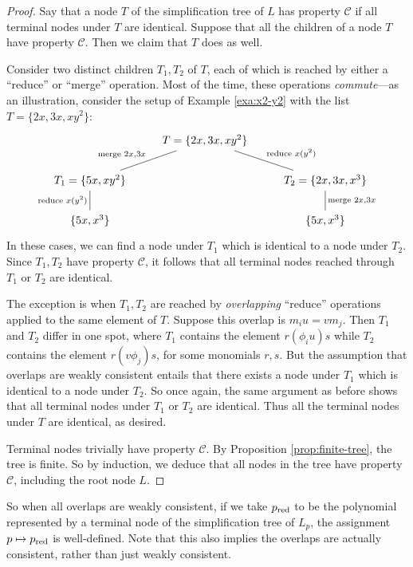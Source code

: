 \begin{proof}
	Say that a node $T$ of the simplification tree of $L$ has property $\mathcal{C}$ if all terminal nodes under $T$ are identical. Suppose that all the children of a node $T$ have property $\mathcal{C}$. Then we claim that $T$ does as well.
	
	Consider two distinct children $T_1, T_2$ of $T$, each of which is reached by either a ``reduce'' or ``merge'' operation. Most of the time, these operations \emph{commute}---as an illustration, consider the setup of Example \ref{exa:x2-y2} with the list $T = \{2x, 3x, xy^2\}$:
	\[\begin{tikzcd}
	& T = \{2x, 3x, xy^2\} \arrow[dash, dl, swap, "\text{merge }2x{,} 3x"] \arrow[dash, dr, "\text{reduce }x(y^2)"]\\
	T_1=\{5x, xy^2\}\arrow[dash,d,swap, "\text{reduce }x(y^2)"] && T_2=\{2x, 3x, x^3\} \arrow[dash,d,"\text{merge }2x{,} 3x"]\\
	\{5x, x^3\} && \{5x, x^3\}
	\end{tikzcd}\]
	In these cases, we can find a node under $T_1$ which is identical to a node under $T_2$. Since $T_1,T_2$ have property $\mathcal{C}$, it follows that all terminal nodes reached through $T_1$ or $T_2$ are identical.
	
	The exception is when $T_1,T_2$ are reached by \emph{overlapping} ``reduce'' operations applied to the same element of $T$. Suppose this overlap is $m_i u = vm_j$. Then $T_1$ and $T_2$ differ in one spot, where $T_1$ contains the element $r(\phi_i u)s$ while $T_2$ contains the element $r(v\phi_j)s$, for some monomials $r,s$. But the assumption that overlaps are weakly consistent entails that there exists a node under $T_1$ which is identical to a node under $T_2$. So once again, the same argument as before shows that all terminal nodes under $T_1$ or $T_2$ are identical. Thus all the terminal nodes under $T$ are identical, as desired.
	
	Terminal nodes trivially have property $\mathcal{C}$. By Proposition \ref{prop:finite-tree}, the tree is finite. So by induction, we deduce that all nodes in the tree have property $\mathcal{C}$, including the root node $L$.
\end{proof}
So when all overlaps are weakly consistent, if we take $p_{\mathrm{red}}$ to be the polynomial represented by a terminal node of the simplification tree of $L_p$, the assignment $p \mapsto p_{\mathrm{red}}$ is well-defined. Note that this also implies the overlaps are actually consistent, rather than just weakly consistent.

